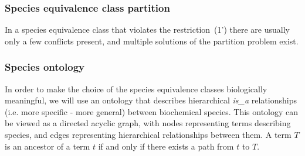\documentclass[9pt]{article}
\newcounter{pbm}
\newcounter{def}
\newcounter{rm}
\begin{document}
\subsubsection*{Species equivalence class partition}



In a species equivalence class that violates the restriction~(1') there are usually only a few conflicts present, and multiple solutions of the partition problem exist. 

\subsubsection*{Species ontology}
In order to make the choice of the species equivalence classes biologically meaningful, we will use an ontology that describes hierarchical \textit{is\_a} relationships (i.e. more specific - more general) between biochemical species. This ontology can be viewed as a directed acyclic graph, with nodes representing terms describing species, and edges representing hierarchical relationships between them. A term $T$ is an ancestor of a term $t$ if and only if there exists a path from $t$ to $T$. 
\end{document}
